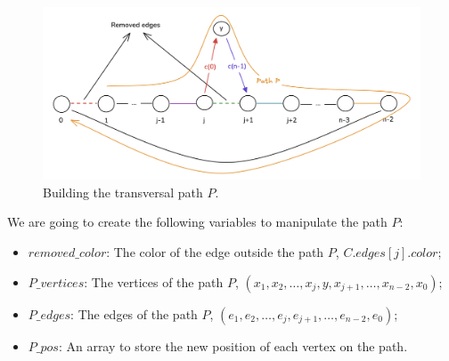 \begin{figure}[H]
    \centering
    \includegraphics[width=1\textwidth]{figuras/cycle_n-1_build_path.png}
    \caption{Building the transversal path $P$.}
    \label{fig:cycle_n-1_build_path}
\end{figure}

We are going to create the following variables to manipulate the path $P$:

\begin{itemize}
    \item $removed\_color$: The color of the edge outside the path $P$, $C.edges[j].color$;
    \item $P\_vertices$: The vertices of the path $P$, $(x_1, x_2, \dots, x_{j}, y, x_{j+1}, \dots, x_{n-2}, x_{0})$;
    \item $P\_edges$: The edges of the path $P$, $(e_1, e_2, \dots, e_{j}, e_{j+1}, \dots, e_{n-2}, e_{0})$;
    \item $P\_pos$: An array to store the new position of each vertex on the path.
\end{itemize}


